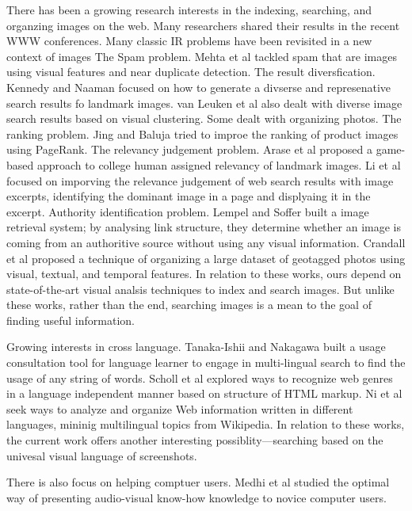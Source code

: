 \documentclass{www2010-submission}
\begin{document}
There has been a growing research interests in the indexing,
searching, and organzing images on the web. Many researchers shared
their results in the recent WWW conferences.  Many classic IR problems
have been revisited in a new context of images The Spam problem.
Mehta et al \cite{Mehta} tackled spam that are images using visual
features and near duplicate detection.  The result
diversfication. Kennedy and Naaman \cite{Kennedy} focused on how to
generate a divserse and represenative search results fo landmark
images. van Leuken et al \cite{vanLeuken} also dealt with diverse
image search results based on visual clustering. Some dealt with
organizing photos. The ranking problem. Jing and Baluja \cite{Jing}
tried to improe the ranking of product images using PageRank.  The
relevancy judgement problem. Arase et al \cite{Arase} proposed a
game-based approach to college human assigned relevancy of landmark
images. Li et al \cite{Li} focused on imporving the relevance
judgement of web search results with image excerpts, identifying the
dominant image in a page and displyaing it in the excerpt.  Authority
identification problem. Lempel and Soffer \cite{Lempel} built a image
retrieval system; by analysing link structure, they determine whether
an image is coming from an authoritive source without using any visual
information.  Crandall et al \cite{Crandall} proposed a technique of
organizing a large dataset of geotagged photos using visual, textual,
and temporal features. In relation to these works, ours depend on
state-of-the-art visual analsis techniques to index and search
images. But unlike these works, rather than the end, searching images
is a mean to the goal of finding useful information.

Growing interests in cross language. Tanaka-Ishii and Nakagawa
\cite{Tanaka-Ishii} built a usage consultation tool for language
learner to engage in multi-lingual search to find the usage of any
string of words. Scholl et al \cite{Scholl} explored ways to recognize
web genres in a language independent manner based on structure of HTML
markup. Ni et al \cite{Ni} seek ways to analyze and organize Web
information written in different languages, mininig multilingual
topics from Wikipedia. In relation to these works, the current work
offers another interesting possiblity---searching based on the
univesal visual language of screenshots.

There is also focus on helping comptuer users. Medhi et al \cite{Medhi}
studied the optimal way of presenting audio-visual know-how knowledge to
novice computer users.
\end{document}
